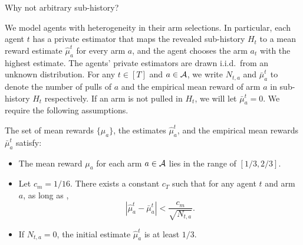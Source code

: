 \begin{remark}
  Why not arbitrary sub-history? 
\end{remark}

 We model agents with heterogeneity in their arm selections. In particular, each agent $t$ has a private estimator that maps the revealed sub-history $H_t$ to a mean reward estimate $\hat{\mu}_a^t$ for every arm $a$, and the agent chooses the arm $a_t$ with the highest estimate. The agents' private estimators are drawn i.i.d.~from an unknown distribution. For any $t\in[T]$ and $a\in \mathcal{A}$, we write $N_{t, a}$ and $\bar{\mu}_a^t$ to denote the number of pulls of $a$ and the empirical mean reward of arm $a$ in sub-history $H_t$ respectively. If an arm is not pulled in $H_t$, we will let $\bar{\mu}_a^t = 0$.  We require the following assumptions.


\begin{assumption}
\label{ass:embehave}
The set of mean rewards $\{\mu_a\}$, the estimates $\hat \mu_a^t$, and the empirical mean rewards $\bar\mu_a^t$  satisfy:

\begin{itemize}
\item The mean reward $\mu_a$ for each arm $a\in \mathcal{A}$ lies in the range
  of $[1/3, 2/3]$.


\item Let $c_m = 1/16$. 
There exists a constant $c_T$ such that for any agent $t$ and
  arm $a$, as long as , 
\[
  \left|\hat{\mu}^t_a - \bar{\mu}^t_a \right| <
  \frac{c_m}{\sqrt{N_{t,a}}}.
\]
\item If $N_{t,a} = 0$, the initial estimate
  $\hat{\mu}^t_a$ is at least $1/3$.
\end{itemize}
\end{assumption}


